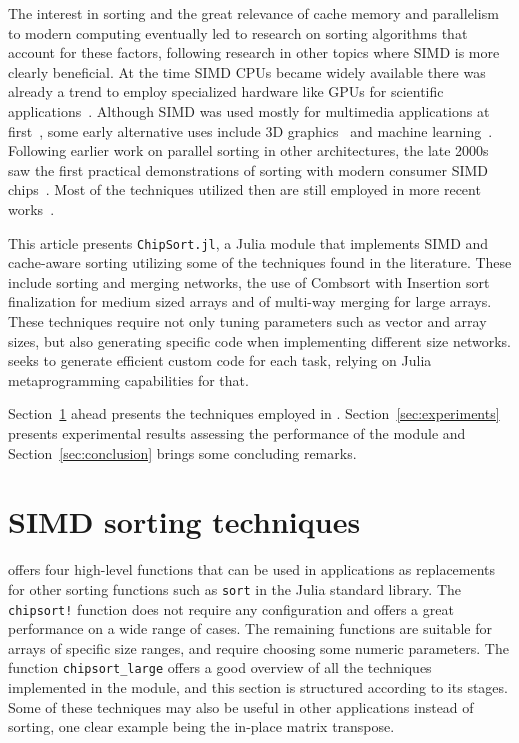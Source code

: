 \documentclass{juliacon}
\begin{document}
The interest in sorting and the great relevance of cache memory and parallelism to modern computing eventually led to research on sorting algorithms that account for these factors, following research in other topics where SIMD is more clearly beneficial. At the time SIMD CPUs became widely available there was already a trend to employ specialized hardware like GPUs for scientific applications~\cite{larsen2001fast,DBLP:conf/micro/ThompsonHO02}. Although SIMD was used mostly for multimedia applications at first~\cite{CHEN2006509,DBLP:journals/mam/SlingerlandS05}, some early alternative uses include 3D graphics~\cite{DBLP:conf/pcm/MaY02} and machine learning~\cite{DBLP:conf/europar/StreyB01}. Following earlier work on parallel sorting in other architectures, the late 2000s saw the first practical demonstrations of sorting with modern consumer SIMD chips~\cite{DBLP:conf/IEEEpact/InoueMKN07,DBLP:journals/pvldb/ChhuganiNLMHCBKD08}. Most of the techniques utilized then are still employed in more recent works~\cite{DBLP:journals/pvldb/BalkesenATO13,DBLP:journals/pvldb/InoueT15}.

This article presents {\tt ChipSort.jl}, a Julia module that implements SIMD and cache-aware sorting utilizing some of the techniques found in the literature. These include sorting and merging networks, the use of Combsort with Insertion sort finalization for medium sized arrays and of multi-way merging for large arrays. These techniques require not only tuning parameters such as vector and array sizes, but also generating specific code when implementing different size networks. \chipsort seeks to generate efficient custom code for each task, relying on Julia metaprogramming capabilities for that.

Section~\ref{sec:methods} ahead presents the techniques employed in \chipsort. Section~\ref{sec:experiments} presents experimental results assessing the performance of the module and Section~\ref{sec:conclusion} brings some concluding remarks.

\section{SIMD sorting techniques}
\label{sec:methods}
%
\chipsort offers four high-level functions that can be used in applications as replacements for other sorting functions such as {\tt sort} in the Julia standard library. The {\tt chipsort!} function does not require any configuration and offers a great performance on a wide range of cases. The remaining functions are suitable for arrays of specific size ranges, and require choosing some numeric parameters. The function {\tt chipsort\_large} offers a good overview of all the techniques implemented in the module, and this section is structured according to its stages. Some of these techniques may also be useful in other applications instead of sorting, one clear example being the in-place matrix transpose.
\end{document}
